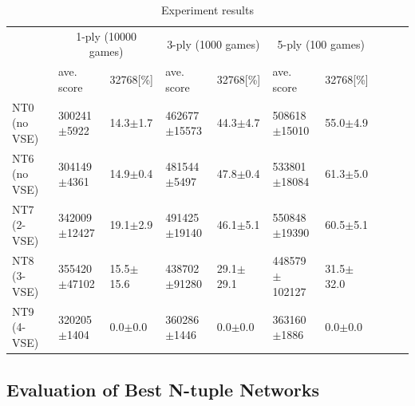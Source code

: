 \begin{table}
 \caption{Experiment results}
 \label{table:exp3}
 \small\begin{tabular}{l|l|l|l|l|l|l|l|l|l}
  \hline \hline
  & \multicolumn{2}{c}{1-ply (10000 games)} & \multicolumn{2}{c}{3-ply (1000 games)} & \multicolumn{2}{c}{5-ply (100 games)} \\
  & ave. score & 32768[\%] & ave. score & 32768[\%] & ave. score & 32768[\%] \\
  \hline
   NT0 (no VSE) & 300241$\pm$\phantom{0}5922	& 14.3$\pm$\phantom{0}1.7		& 462677$\pm$15573		& 44.3$\pm$\phantom{0}4.7		& 508618$\pm$\phantom{0}15010	& 55.0$\pm$\phantom{0}4.9 \\ \hline
   NT6 (no VSE) & 304149$\pm$\phantom{0}4361	& 14.9$\pm$\phantom{0}0.4		& 481544$\pm$\phantom{0}5497	& 47.8$\pm$\phantom{0}0.4	& 533801$\pm$\phantom{0}18084	& 61.3$\pm$\phantom{0}5.0 \\ \hline
   NT7 (2-VSE)	& 342009$\pm$12427		& 19.1$\pm$\phantom{0}2.9		& 491425$\pm$19140		& 46.1$\pm$\phantom{0}5.1		& 550848$\pm$\phantom{0}19390	& 60.5$\pm$\phantom{0}5.1 \\\hline
   NT8 (3-VSE)	& 355420$\pm$47102		& 15.5$\pm$15.6				& 438702$\pm$91280		& 29.1$\pm$29.1		& 448579$\pm$102127	& 31.5$\pm$32.0 \\\hline
   NT9 (4-VSE)	& 320205$\pm$\phantom{0}1404	& \phantom{0}0.0$\pm$\phantom{0}0.0	& 360286$\pm$\phantom{0}1446	& \phantom{0}0.0$\pm$\phantom{0}0.0		& 363160$\pm$\phantom{00}1886	& \phantom{0}0.0$\pm$\phantom{0}0.0 \\\hline
 \end{tabular}
\end{table}

\subsection{Evaluation of Best N-tuple Networks}



